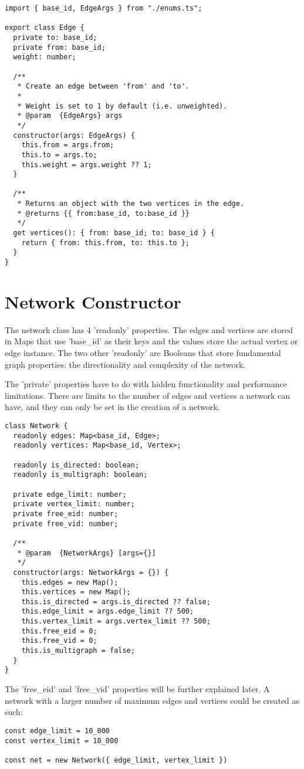 \begin{verbatim}
import { base_id, EdgeArgs } from "./enums.ts";

export class Edge {
  private to: base_id;
  private from: base_id;
  weight: number;

  /**
   * Create an edge between 'from' and 'to'.
   *
   * Weight is set to 1 by default (i.e. unweighted).
   * @param  {EdgeArgs} args
   */
  constructor(args: EdgeArgs) {
    this.from = args.from;
    this.to = args.to;
    this.weight = args.weight ?? 1;
  }

  /**
   * Returns an object with the two vertices in the edge.
   * @returns {{ from:base_id, to:base_id }}
   */
  get vertices(): { from: base_id; to: base_id } {
    return { from: this.from, to: this.to };
  }
}
\end{verbatim}

\section{Network Constructor}

The network class has 4 'readonly' properties. The edges and vertices are stored in Maps that use 'base\_id' as their keys and the values store the actual vertex or edge instance. The two other 'readonly' are Booleans that store fundamental graph properties: the directionality and complexity of the network.

The 'private' properties have to do with hidden functionality and performance limitations. There are limits to the number of edges and vertices a network can have, and they can only be set in the creation of a network.

\begin{verbatim}
class Network {
  readonly edges: Map<base_id, Edge>;
  readonly vertices: Map<base_id, Vertex>;

  readonly is_directed: boolean;
  readonly is_multigraph: boolean;

  private edge_limit: number;
  private vertex_limit: number;
  private free_eid: number;
  private free_vid: number;

  /**
   * @param  {NetworkArgs} [args={}]
   */
  constructor(args: NetworkArgs = {}) {
    this.edges = new Map();
    this.vertices = new Map();
    this.is_directed = args.is_directed ?? false;
    this.edge_limit = args.edge_limit ?? 500;
    this.vertex_limit = args.vertex_limit ?? 500;
    this.free_eid = 0;
    this.free_vid = 0;
    this.is_multigraph = false;
  }
}
\end{verbatim}

The 'free\_eid' and 'free\_vid' properties will be further explained later. A network with a larger number of maximum edges and vertices could be created as such:

\begin{verbatim}
const edge_limit = 10_000
const vertex_limit = 10_000

const net = new Network({ edge_limit, vertex_limit })
\end{verbatim}